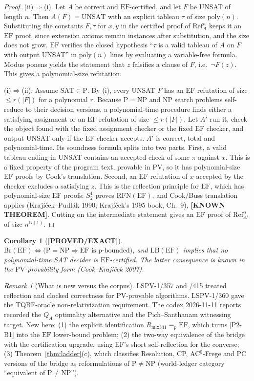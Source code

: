 \documentclass[11pt]{article}
\newtheorem{corollary}[theorem]{Corollary}
\theoremstyle{definition}
\theoremstyle{remark}
\newtheorem*{remark}{Remark}
\newcommand{\SAT}{\mathrm{SAT}}
\newcommand{\EF}{\mathrm{EF}}
\newcommand{\PV}{\mathrm{PV}}
\newcommand{\Rmix}{R_{\mathrm{mix341}}}
\newcommand{\Ref}{\mathrm{Ref}}
\newcommand{\status}[1]{\textbf{[#1]}}
\begin{document}
\begin{proof}
(ii)$\Rightarrow$(i). Let $A$ be correct and $\EF$-certified, and let $F$ be UNSAT of length $n$.
Then $A(F)=\mathrm{UNSAT}$ with an explicit tableau $\tau$ of size $\mathrm{poly}(n)$.
Substituting the constants $F,\tau$ for $x,y$ in the certified proof of $\Ref_A^n$ keeps it an $\EF$ proof,
since extension axioms remain instances after substitution, and the size does not grow.
$\EF$ verifies the closed hypothesis ``$\tau$ is a valid tableau of $A$ on $F$ with output UNSAT'' in
$\mathrm{poly}(n)$ lines by evaluating a variable-free formula. Modus ponens yields the
statement that $z$ falsifies a clause of $F$, i.e.\ $\neg F(z)$. This gives a polynomial-size refutation.

(i)$\Rightarrow$(ii). Assume $\SAT\in\mathrm P$. By (i), every UNSAT $F$ has an $\EF$ refutation of size
$\le r(|F|)$ for a polynomial $r$. Because $\mathrm P=\mathrm{NP}$ and NP search problems
self-reduce to their decision versions, a polynomial-time procedure finds either a satisfying assignment
or an $\EF$ refutation of size $\le r(|F|)$. Let $A'$ run it, check the object found with the fixed
assignment checker or the fixed $\EF$ checker, and output UNSAT only if the $\EF$ checker accepts.
$A'$ is correct, total and polynomial-time. Its soundness formula splits into two parts.
First, a valid tableau ending in UNSAT contains an accepted check of some $\pi$ against $x$. This is
a fixed property of the program text, provable in $\PV$, so it has polynomial-size $\EF$ proofs by
Cook's translation. Second, an $\EF$ refutation of $x$ accepted by the checker excludes a satisfying
$z$. This is the reflection principle for $\EF$, which has polynomial-size $\EF$ proofs:
$S^1_2$ proves $\mathrm{RFN}(\EF)$, and Cook/Buss translation applies
(Kraj\'i\v{c}ek--Pudl\'ak 1990; Kraj\'i\v{c}ek's 1995 book, Ch.~9), \status{KNOWN THEOREM}. Cutting on
the intermediate statement gives an $\EF$ proof of $\Ref_{A'}^n$ of size $n^{O(1)}$.
\end{proof}
\begin{corollary}[\status{PROVED/EXACT}]
$\mathrm{Br}(\EF)\Leftrightarrow\bigl(\mathrm P=\mathrm{NP}\Rightarrow\EF\text{ is p-bounded}\bigr)$, and
$\mathrm{LB}(\EF)$ implies that no polynomial-time SAT decider is $\EF$-certified.
The latter consequence is known in the $\PV$-provability form (Cook--Kraj\'i\v{c}ek 2007).
\end{corollary}
\begin{remark}[What is new versus the corpus]
LSPV-1/357 and /415 treated reflection and clocked correctness for $\PV$-provable algorithms.
LSPV-1/360 gave the TQBF-oracle non-relativization requirement. The codex 2026-11-11 reports
recorded the $Q_A$ optimality alternative and the Pich--Santhanam witnessing target.
New here: (1) the explicit identification $\Rmix\equiv_p\EF$, which turns [P2-B1] into the $\EF$
lower-bound problem; (2) the two-way equivalence of the bridge with the certification upgrade, using
$\EF$'s short self-reflection for the converse; (3) Theorem~\ref{thm:ladder}(c), which classifies
Resolution, CP, AC$^0$-Frege and PC versions of the bridge as reformulations of P$\ne$NP
(world-ledger category ``equivalent of P$\ne$NP'').
\end{remark}
\end{document}
